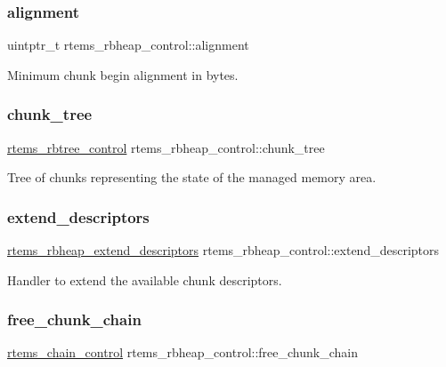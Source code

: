 \subsubsection{\texorpdfstring{alignment}{alignment}}
{\footnotesize\ttfamily uintptr\+\_\+t rtems\+\_\+rbheap\+\_\+control\+::alignment}

Minimum chunk begin alignment in bytes. \mbox{\label{structrtems__rbheap__control_a9bde26d69cdde1fe6f9455d58b6b1ef3}} 
\subsubsection{\texorpdfstring{chunk\_tree}{chunk\_tree}}
{\footnotesize\ttfamily \mbox{\hyperlink{group__ClassicRBTrees_ga21fe446d0b3cb8b25c814e93357753ef}{rtems\+\_\+rbtree\+\_\+control}} rtems\+\_\+rbheap\+\_\+control\+::chunk\+\_\+tree}

Tree of chunks representing the state of the managed memory area. \mbox{\label{structrtems__rbheap__control_a85883a3e5d1acabbbf80dc953dfb4148}} 
\subsubsection{\texorpdfstring{extend\_descriptors}{extend\_descriptors}}
{\footnotesize\ttfamily \mbox{\hyperlink{group__RBHeap_gaa15b8f5425b4d2aa188607bb9941fb20}{rtems\+\_\+rbheap\+\_\+extend\+\_\+descriptors}} rtems\+\_\+rbheap\+\_\+control\+::extend\+\_\+descriptors}

Handler to extend the available chunk descriptors. \mbox{\label{structrtems__rbheap__control_a64cdd27a044b910a37e6524b597d0622}} 
\subsubsection{\texorpdfstring{free\_chunk\_chain}{free\_chunk\_chain}}
{\footnotesize\ttfamily \mbox{\hyperlink{unionChain__Control}{rtems\+\_\+chain\+\_\+control}} rtems\+\_\+rbheap\+\_\+control\+::free\+\_\+chunk\+\_\+chain}

